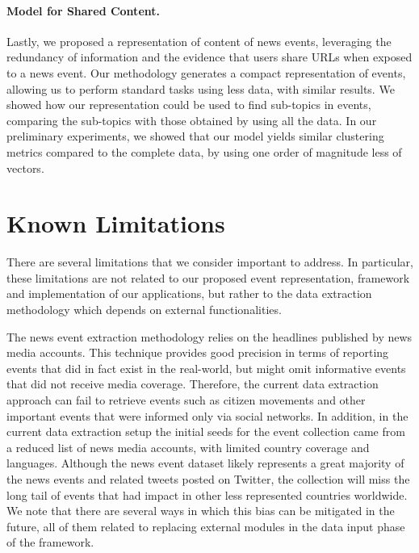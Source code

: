 \paragraph{Model for Shared Content.}
%
Lastly, we proposed a representation of content of news events, leveraging the
redundancy of information and the evidence that users share URLs when exposed to
a news event.
%
Our methodology generates a compact representation of events, allowing us to
perform standard tasks using less data, with similar results.
%
We showed how our representation could be used to find sub-topics in events,
comparing the sub-topics with those obtained by using all the data.
%
In our preliminary experiments, we showed that our model yields similar
clustering metrics compared to the complete data, by using one order of
magnitude less of vectors.



\section{Known Limitations}


There are several limitations that we consider important to address. 
%
In particular, these limitations are not related to our proposed event
representation, framework and implementation of our applications, but rather to
the data extraction methodology which depends on external functionalities.

The news event extraction methodology relies on the headlines published by news
media accounts. 
%
This technique provides good precision in terms of reporting events that did in
fact exist in the real-world, but might omit informative events that did not
receive media coverage.
%
Therefore, the current data extraction approach can fail to retrieve events such
as citizen movements and other important events that were informed only via
social networks.  
%
In addition, in the current data extraction setup the initial seeds for the
event collection came from a reduced list of news media accounts, with limited
country coverage and languages.
%
Although the news event dataset likely represents a great majority of the news
events and related tweets posted on Twitter, the collection will miss the long
tail of events that had impact in other less represented countries worldwide. 
%
We note that there are several ways in which this bias can be mitigated in the
future, all of them related to replacing external modules in the data input
phase of the framework.

